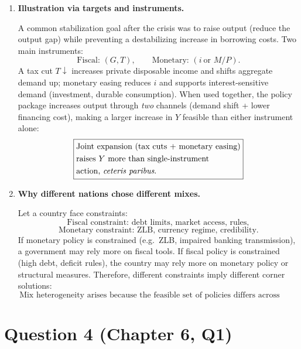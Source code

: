 \documentclass[12pt]{article}
\begin{document}
\begin{enumerate}[label=(\alph*)]
\item \textbf{Illustration via targets and instruments.}

A common stabilization goal after the crisis was to raise output (reduce the output gap) while preventing a destabilizing increase in borrowing costs. Two main instruments:
\[
\text{Fiscal: }(G,T),\qquad \text{Monetary: }(i\ \text{or }M/P).
\]
A tax cut \(T\downarrow\) increases private disposable income and shifts aggregate demand up; monetary easing reduces \(i\) and supports interest-sensitive demand (investment, durable consumption). When used together, the policy package increases output through \emph{two} channels (demand shift + lower financing cost), making a larger increase in \(Y\) feasible than either instrument alone:
\begin{align*}
\boxed{
  \begin{aligned}
    &\text{Joint expansion (tax cuts + monetary easing)} \\
    &\text{raises } Y \text{ more than single-instrument} \\
    &\text{action, \textit{ceteris paribus}.}
  \end{aligned}
}
\end{align*}

\item \textbf{Why different nations chose different mixes.}

Let a country face constraints:
\[
\text{Fiscal constraint: } \text{debt limits, market access, rules}, 
\]
\[
\text{Monetary constraint: } \text{ZLB, currency regime, credibility}.
\]
If monetary policy is constrained (e.g.\ ZLB, impaired banking transmission), a government may rely more on fiscal tools. If fiscal policy is constrained (high debt, deficit rules), the country may rely more on monetary policy or structural measures. Therefore, different constraints imply different corner solutions:
\[
\boxed{\,\text{Mix heterogeneity arises because the feasible set of policies differs across countries.}\,}
\]
\end{enumerate}

\newpage

\section*{Question 4 (Chapter 6, Q1)}
\end{document}

